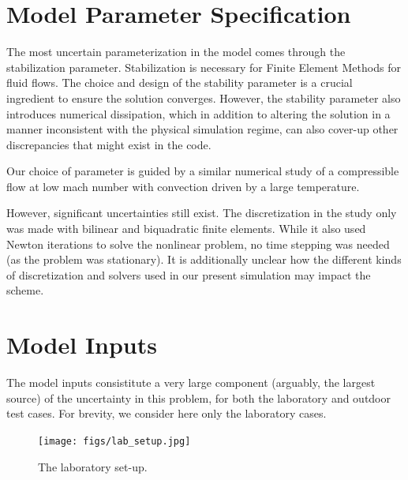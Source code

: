 \documentclass{article}
\begin{document}
%
% 
%
%
\section{Model Parameter Specification}

The most uncertain parameterization in the model comes through the
stabilization parameter. Stabilization is necessary for Finite Element
Methods for fluid flows\cite{franca1992stabilized}. The choice and
design of the stability parameter is a crucial ingredient to ensure the
solution converges. However, the stability parameter also introduces
numerical dissipation, which in addition to altering the solution in a
manner inconsistent with the physical simulation regime, can also
cover-up other discrepancies that might exist in the code. 

Our choice of parameter is guided by a similar numerical
study\cite{Becker2002428} of a compressible flow at low mach number with
convection driven by a large temperature. 

However, significant uncertainties still exist. The discretization in
the study only was made with bilinear and biquadratic finite elements. 
While it also used Newton iterations to solve the nonlinear problem, no
time stepping was needed (as the problem was stationary). It is
additionally unclear how the different kinds of discretization and
solvers used in our present simulation may impact the scheme.

%
%
%
\section{Model Inputs}

The model inputs consistitute a very large component (arguably, the
largest source) of the uncertainty in this problem, for both the
laboratory and outdoor test cases. For brevity, we consider here only
the laboratory cases. 

  \begin{figure}[!htb]
    \begin{center}
     \texttt{[image: figs/lab\_setup.jpg]}
     \caption{The laboratory set-up.}
     \label{lab}
    \end{center}
  \end{figure}
\end{document}
